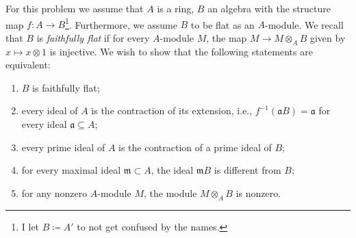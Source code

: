 \documentclass{article}
\newcommand{\m}{\mathfrak{m}}
\newcommand{\tensor}{\otimes}
\renewcommand{\a}{\mathfrak{a}}
\begin{document}
    For this problem we assume that $A$ is a ring, $B$ an algebra with the
    structure map $f \colon A \to B$\footnote{I let $B \coloneqq A'$ to not get
    confused by the names.}. Furthermore, we assume $B$ to be flat as an
    $A$-module. We recall that $B$ is \emph{faithfully flat} if for every
    $A$-module $M$, the map $M \to M \tensor_A B$ given by $x \mapsto x \tensor
    1$ is injective. We wish to show that the following statements are
    equivalent:

    \begin{enumerate}[(1)]
        \item $B$ is faithfully flat;
        \item every ideal of $A$ is the contraction of its extension, i.e.,
            $f^{-1}(\a B) = \a$ for every ideal $\a \subseteq A$;
        \item every prime ideal of $A$ is the contraction of a prime ideal of
            $B$;
        \item for every maximal ideal $\m \subset A$, the ideal $\m B$ is
            different from $B$;
        \item for any nonzero $A$-module $M$, the module $M \tensor_A B$ is
            nonzero.
    \end{enumerate}
\end{document}
